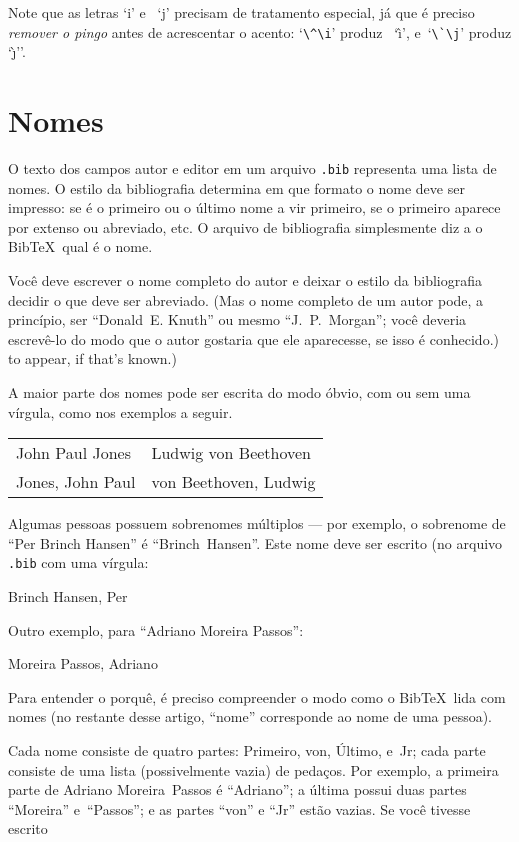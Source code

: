 \documentclass[article,openany]{memoir}
\newcommand*{\extensao}[1]{\texttt{#1}}
\newcommand*{\as}[1]{%
  `\thinspace#1\thinspace'}
\newenvironment{exemplo}{\begin{center}}{\end{center}}
\begin{document}
Note que as letras \as{i} e~\as{j} precisam de tratamento especial, já
que é preciso \emph{remover o pingo} antes de acrescentar o acento:
`\verb/\^\i/' produz~\as{\^\i}, e~`\verb/\`\j/' produz \as{\`\j'}.

\chapter{Nomes}

O texto dos campos autor e editor em um arquivo \extensao{.bib}
representa uma lista de nomes. O estilo da bibliografia determina em
que formato o nome deve ser impresso: se é o primeiro ou o último nome
a vir primeiro, se o primeiro aparece por extenso ou abreviado, etc. O
arquivo de bibliografia simplesmente diz a o Bib\TeX\ qual é o nome.

Você deve escrever o nome completo do autor e deixar o estilo da
bibliografia decidir o que deve ser abreviado. (Mas o nome completo de
um autor pode, a princípio, ser ``Donald~E. Knuth'' ou mesmo
``J.~P.~Morgan''; você deveria escrevê-lo do modo que o autor gostaria
que ele aparecesse, se isso é conhecido.)  to appear, if that's
known.)

A maior parte dos nomes pode ser escrita do modo óbvio, com ou sem uma vírgula, como nos exemplos a seguir.
\begin{exemplo}
\begin{tabular}{p{5cm}l}
John Paul Jones  &  Ludwig von Beethoven \\
Jones, John Paul &  von Beethoven, Ludwig
\end{tabular}
\end{exemplo}


Algumas pessoas possuem sobrenomes múltiplos --- por exemplo, o
sobrenome de ``Per Brinch Hansen'' é ``Brinch~Hansen''. Este nome deve
ser escrito (no arquivo \extensao{.bib} com uma vírgula:

\begin{exemplo}
Brinch Hansen, Per
\end{exemplo}

Outro exemplo, para ``Adriano Moreira Passos'':

\begin{exemplo}
Moreira Passos, Adriano
\end{exemplo}

Para entender o porquê, é preciso compreender o modo como o
Bib\TeX\ lida com nomes (no restante desse artigo, ``nome''
corresponde ao nome de uma pessoa).

Cada nome consiste de quatro partes: Primeiro, von, Último, e~Jr; cada
parte consiste de uma lista (possivelmente vazia) de pedaços.  Por
exemplo, a primeira parte de Adriano Moreira~Passos é ``Adriano''; a
última possui duas partes ``Moreira'' e~``Passos''; e as partes
``von'' e ``Jr'' estão vazias. Se você tivesse escrito
\end{document}
